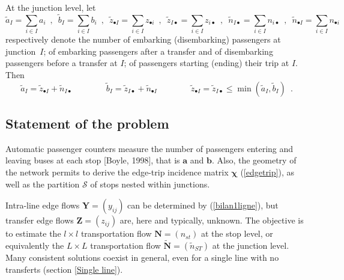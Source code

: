 \documentclass{llncs}
\begin{document}
At the junction level, let 
\begin{displaymath}
\tilde{a}_I=\sum_{i\in I} a_i\enspace,\enspace\tilde{b}_I=\sum_{i\in I} b_i\enspace,\enspace\tilde{z}_{\bullet I}=\sum_{i\in I} z_{\bullet i}\enspace,\enspace\tilde{z}_{I\bullet}=\sum_{i\in I} z_{i\bullet}\enspace,\enspace\tilde{n}_{I\bullet}=\sum_{i\in I} n_{i\bullet}\enspace,\enspace\tilde{n}_{\bullet I}=\sum_{i\in I} n_{\bullet i}
\end{displaymath}
 respectively denote the number of embarking (disembarking)  passengers at junction~$I$; of embarking passengers after a transfer and of disembarking passengers before a transfer at  $I$; of passengers starting (ending) their trip at $I$. Then 
\begin{equation}
\label{junctionLevel}
\tilde{a}_I=\tilde{z}_{\bullet I}+\tilde{n}_{I\bullet}\qquad\qquad \tilde{b}_I=\tilde{z}_{I\bullet}+\tilde{n}_{\bullet I}\qquad\qquad \tilde{z}_{\bullet I}=\tilde{z}_{I\bullet}\le \min(\tilde{a}_I,\tilde{b}_I)\enspace. 
\end{equation}

 
\subsection{Statement of the problem}
Automatic passenger counters measure the number of passengers entering and leaving buses at each stop [Boyle, 1998], that is $\mathbf{a}$ and $\mathbf{b}$. Also, the geometry of the network permits to derive the edge-trip incidence matrix $\bm{\chi}$ (\ref{edgetrip}), as well as the partition $\mathcal{S}$  of stops nested within junctions. 

Intra-line edge flows $\mathbf{Y}=(y_{ij})$ can be determined by (\ref{bilan1ligne}), but transfer edge flows $\mathbf{Z}=(z_{ij})$ are, here and typically, unknown. The objective is to estimate the $l\times l$ transportation flow $\mathbf{N}=(n_{st})$ at the stop level, or equivalently  the $L\times L$  transportation flow  $\tilde{\mathbf{N}}=(\tilde{n}_{ST})$ at the junction level. Many consistent solutions coexist in general, even for a single line with no transferts (section \ref{Single line}).
\end{document}

